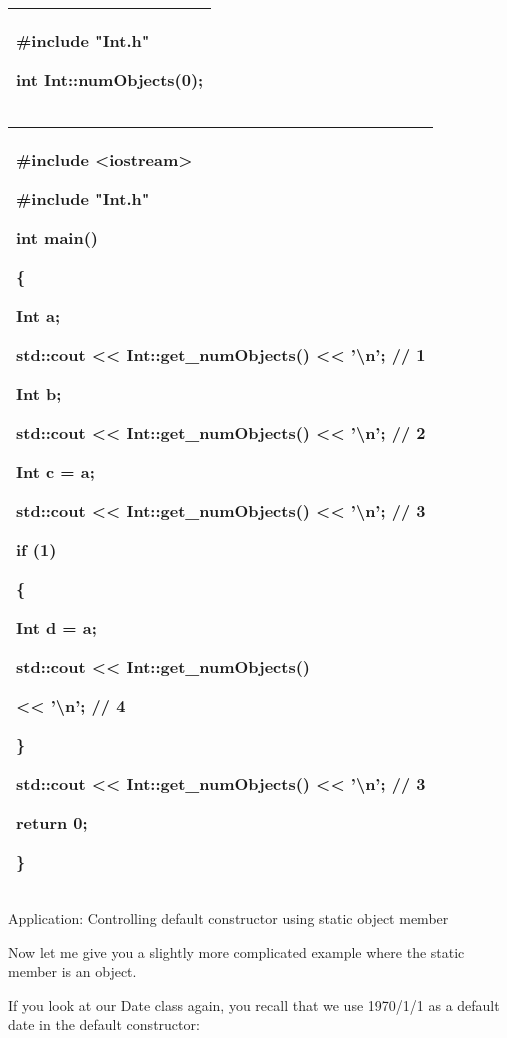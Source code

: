 \documentclass[
]{article}
\begin{document}
\begin{longtable}[]{@{}l@{}}
\toprule
\endhead
\begin{minipage}[t]{0.97\columnwidth}\raggedright
\#include "Int.h"

int Int::numObjects(0);\strut
\end{minipage}\tabularnewline
\bottomrule
\end{longtable}

\begin{longtable}[]{@{}l@{}}
\toprule
\endhead
\begin{minipage}[t]{0.97\columnwidth}\raggedright
\#include \textless iostream\textgreater{}

\#include "Int.h"

int main()

\{

Int a;

std::cout \textless\textless{} Int::get\_numObjects()
\textless\textless{} '\textbackslash n'; // 1

Int b;

std::cout \textless\textless{} Int::get\_numObjects()
\textless\textless{} '\textbackslash n'; // 2

Int c = a;

std::cout \textless\textless{} Int::get\_numObjects()
\textless\textless{} '\textbackslash n'; // 3

if (1)

\{

Int d = a;

std::cout \textless\textless{} Int::get\_numObjects()

\textless\textless{} '\textbackslash n'; // 4

\}

std::cout \textless\textless{} Int::get\_numObjects()
\textless\textless{} '\textbackslash n'; // 3

\hfill\break
return 0;

\}\strut
\end{minipage}\tabularnewline
\bottomrule
\end{longtable}

Application: Controlling default constructor using static object member

Now let me give you a slightly more complicated example where the static
member is an object.

If you look at our Date class again, you recall that we use 1970/1/1 as
a default date in the default constructor:
\end{document}
